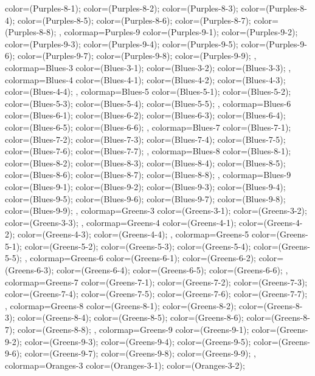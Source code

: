 {{  color=(Purples-8-1);
  color=(Purples-8-2);
  color=(Purples-8-3);
  color=(Purples-8-4);
  color=(Purples-8-5);
  color=(Purples-8-6);
  color=(Purples-8-7);
  color=(Purples-8-8);
},
colormap={Purples-9}{
  color=(Purples-9-1);
  color=(Purples-9-2);
  color=(Purples-9-3);
  color=(Purples-9-4);
  color=(Purples-9-5);
  color=(Purples-9-6);
  color=(Purples-9-7);
  color=(Purples-9-8);
  color=(Purples-9-9);
},
colormap={Blues-3}{
  color=(Blues-3-1);
  color=(Blues-3-2);
  color=(Blues-3-3);
},
colormap={Blues-4}{
  color=(Blues-4-1);
  color=(Blues-4-2);
  color=(Blues-4-3);
  color=(Blues-4-4);
},
colormap={Blues-5}{
  color=(Blues-5-1);
  color=(Blues-5-2);
  color=(Blues-5-3);
  color=(Blues-5-4);
  color=(Blues-5-5);
},
colormap={Blues-6}{
  color=(Blues-6-1);
  color=(Blues-6-2);
  color=(Blues-6-3);
  color=(Blues-6-4);
  color=(Blues-6-5);
  color=(Blues-6-6);
},
colormap={Blues-7}{
  color=(Blues-7-1);
  color=(Blues-7-2);
  color=(Blues-7-3);
  color=(Blues-7-4);
  color=(Blues-7-5);
  color=(Blues-7-6);
  color=(Blues-7-7);
},
colormap={Blues-8}{
  color=(Blues-8-1);
  color=(Blues-8-2);
  color=(Blues-8-3);
  color=(Blues-8-4);
  color=(Blues-8-5);
  color=(Blues-8-6);
  color=(Blues-8-7);
  color=(Blues-8-8);
},
colormap={Blues-9}{
  color=(Blues-9-1);
  color=(Blues-9-2);
  color=(Blues-9-3);
  color=(Blues-9-4);
  color=(Blues-9-5);
  color=(Blues-9-6);
  color=(Blues-9-7);
  color=(Blues-9-8);
  color=(Blues-9-9);
},
colormap={Greens-3}{
  color=(Greens-3-1);
  color=(Greens-3-2);
  color=(Greens-3-3);
},
colormap={Greens-4}{
  color=(Greens-4-1);
  color=(Greens-4-2);
  color=(Greens-4-3);
  color=(Greens-4-4);
},
colormap={Greens-5}{
  color=(Greens-5-1);
  color=(Greens-5-2);
  color=(Greens-5-3);
  color=(Greens-5-4);
  color=(Greens-5-5);
},
colormap={Greens-6}{
  color=(Greens-6-1);
  color=(Greens-6-2);
  color=(Greens-6-3);
  color=(Greens-6-4);
  color=(Greens-6-5);
  color=(Greens-6-6);
},
colormap={Greens-7}{
  color=(Greens-7-1);
  color=(Greens-7-2);
  color=(Greens-7-3);
  color=(Greens-7-4);
  color=(Greens-7-5);
  color=(Greens-7-6);
  color=(Greens-7-7);
},
colormap={Greens-8}{
  color=(Greens-8-1);
  color=(Greens-8-2);
  color=(Greens-8-3);
  color=(Greens-8-4);
  color=(Greens-8-5);
  color=(Greens-8-6);
  color=(Greens-8-7);
  color=(Greens-8-8);
},
colormap={Greens-9}{
  color=(Greens-9-1);
  color=(Greens-9-2);
  color=(Greens-9-3);
  color=(Greens-9-4);
  color=(Greens-9-5);
  color=(Greens-9-6);
  color=(Greens-9-7);
  color=(Greens-9-8);
  color=(Greens-9-9);
},
colormap={Oranges-3}{
  color=(Oranges-3-1);
  color=(Oranges-3-2);
}}
